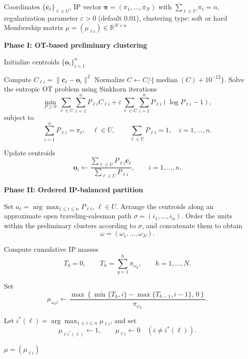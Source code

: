 \documentclass[12pt]{imsart}
\theoremstyle{plain}
\theoremstyle{remark}
\begin{document}
\begin{algorithm}[H]
\caption{IP-Balanced \(n\)-Means Clustering (IP\(n\)M)}
\label{alg:IP_balanced_nmeans}
\small
\begin{algorithmic}[1]

\Require Coordinates \(\{\bm c_\ell\}_{\ell\in U}\), IP vector
\(\bm\pi=(\pi_1,\ldots,\pi_N)\) with \(\sum_{\ell\in U}\pi_\ell=n\),
regularization parameter \(\varepsilon>0\) (default \(0.01\)), clustering type: soft or hard
\Ensure Membership matrix \(\mu=(\mu_{\ell i})\in\mathbb R^{N\times n}\)

\Statex \textbf{Phase I: OT-based preliminary clustering}

\State Initialize centroids \(\{\bm o_i\}_{i=1}^n\)

\Repeat
\State Compute \(C_{\ell i}=\|\bm c_\ell-\bm o_i\|^2\)
\State Normalize
\(
C\gets C/\{\operatorname{median}(C)+10^{-12}\}.
\)
\State Solve the entropic OT problem using Sinkhorn iterations
\[
\min_{P\ge 0}
\sum_{\ell\in U}\sum_{i=1}^n P_{\ell i}C_{\ell i}
+
\varepsilon
\sum_{\ell\in U}\sum_{i=1}^n
P_{\ell i}(\log P_{\ell i}-1),
\]
subject to
\[
\sum_{i=1}^n P_{\ell i}=\pi_\ell,\quad \ell\in U,
\qquad
\sum_{\ell\in U}P_{\ell i}=1,\quad i=1,\ldots,n .
\]

\State Update centroids
\[
\bm o_i
\gets
\frac{\sum_{\ell\in U}P_{\ell i}\bm c_\ell}
     {\sum_{\ell\in U}P_{\ell i}},
\qquad i=1,\ldots,n .
\]


\Statex \textbf{Phase II: Ordered IP-balanced partition}

\State Set \(a_\ell=\arg\max_{1\le i\le n}P_{\ell i}\), \(\ell\in U\).
\State Arrange the centroids along an approximate open traveling-salesman
path \(\sigma=(i_1,\ldots,i_n)\).
\State Order the units within the preliminary clusters according to
\(\sigma\), and concatenate them to obtain
\[
\omega=(\omega_1,\ldots,\omega_N).
\]

\State Compute cumulative IP masses
\[
T_0=0,
\qquad
T_h=\sum_{q=1}^{h}\pi_{\omega_q},
\qquad h=1,\ldots,N .
\]

\State Set
\[
\mu_{\omega_h i}
\gets
\frac{
\max\!\left\{
\min\{T_h,i\}-\max\{T_{h-1},i-1\},\,0
\right\}
}
{\pi_{\omega_h}} .
\]
\EndFor
\EndFor

\State Let \(i^\ast(\ell)=\arg\max_{1\le i\le n}\mu_{\ell i}\), and set
\[
\mu_{\ell i^\ast(\ell)}\gets 1,
\qquad
\mu_{\ell i}\gets 0
\quad (i\neq i^\ast(\ell)).
\]
\EndFor
\EndIf

\State \Return \(\mu=(\mu_{\ell i})\)

\end{algorithmic}
\end{algorithm}
\end{document}
